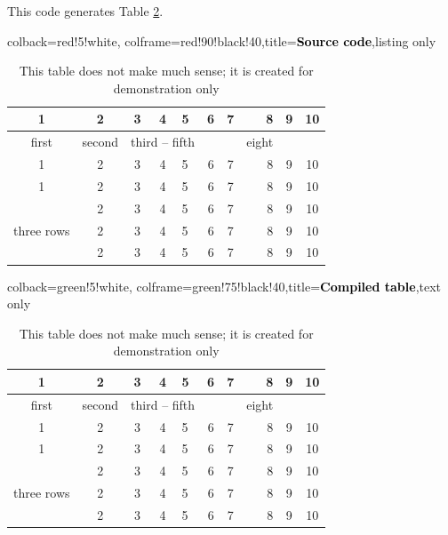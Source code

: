 \documentclass[a4paper,11pt]{article}
\begin{document}
This code generates Table \ref{tab:mytab}.

\bigskip

\begin{tcblisting}{colback=red!5!white, colframe=red!90!black!40,title=\textbf{\textcolor{black}{Source code}},listing only}
\begin{table}[H]
	\begin{center}
		\caption[Meaningless table]{This table does not make much sense; it is created for demonstration only}\label{tab:mytab}
		\begin{tabular}{|c|c|c|c||l|c|c|r|c|c|}
			\hline
			1 & 2 & 3 & 4 & 5 & 6 & 7 & 8 & 9 & 10 \\ \hline
			first & second & \multicolumn{3}{|c|}{third -- fifth} &   &  & eight &   &  \\ 
			\cline{1-7} \cline{9-10}
			1 & 2 & 3 & 4 & 5 & 6 & 7 & 8 & 9 & 10 \\ \hline
			1 & 2 & 3 & 4 & 5 & 6 & 7 & 8 & 9 & 10 \\ \hline
			\multirow{3}{*}{three rows}  & 2 & 3 & 4 & 5 & 6 & 7 & 8 & 9 & 10 \\ \cline{2-10}
			& 2 & 3 & 4 & 5 & 6 & 7 & 8 & 9 & 10 \\
			& 2 & 3 & 4 & 5 & 6 & 7 & 8 & 9 & 10 \\ \hline
		\end{tabular}
	\end{center}
\end{table}
\end{tcblisting}

\begin{tcblisting}{colback=green!5!white, colframe=green!75!black!40,title=\textbf{\textcolor{black}{Compiled table}},text only}
	\begin{table}[H] %
		\begin{center}
			\caption[Meaningless table]{This table does not make much sense; it is created for demonstration only}\label{tab:mytab}
			\begin{tabular}{|c|c|c|c||l|c|c|r|c|c|}
				\hline
				1 & 2 & 3 & 4 & 5 & 6 & 7 & 8 & 9 & 10 \\ \hline
				first & second & \multicolumn{3}{|c|}{third -- fifth} &   &  & eight &   &  \\ 
				\cline{1-7} \cline{9-10}%
				1 & 2 & 3 & 4 & 5 & 6 & 7 & 8 & 9 & 10 \\ \hline
				1 & 2 & 3 & 4 & 5 & 6 & 7 & 8 & 9 & 10 \\ \hline
				\multirow{3}{*}{three rows}  & 2 & 3 & 4 & 5 & 6 & 7 & 8 & 9 & 10 \\ \cline{2-10}
				& 2 & 3 & 4 & 5 & 6 & 7 & 8 & 9 & 10 \\ %
				& 2 & 3 & 4 & 5 & 6 & 7 & 8 & 9 & 10 \\ \hline
			\end{tabular}
		\end{center}
	\end{table}
\end{tcblisting}
\end{document}
